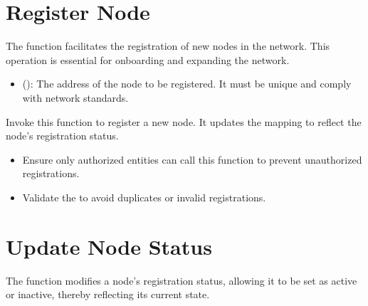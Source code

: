 \documentclass[letterpaper,10pt,english]{sphinxmanual}
\begin{document}
\sphinxAtStartPar
{}


\section{Register Node}
\label{\detokenize{docs_node_manager_contract:register-node}}
\sphinxAtStartPar
The  function facilitates the registration of new nodes in the network. This operation is essential for onboarding and expanding the network.

\sphinxAtStartPar
{}

\sphinxAtStartPar
{}
\begin{itemize}
\item {} 
\sphinxAtStartPar
{} ():
The address of the node to be registered. It must be unique and comply with network standards.

\end{itemize}

\sphinxAtStartPar
{}

\sphinxAtStartPar
Invoke this function to register a new node. It updates the  mapping to reflect the node’s registration status.

\sphinxAtStartPar
{}
\begin{itemize}
\item {} 
\sphinxAtStartPar
{} Ensure only authorized entities can call this function to prevent unauthorized registrations.

\item {} 
\sphinxAtStartPar
{} Validate the  to avoid duplicates or invalid registrations.

\end{itemize}


\section{Update Node Status}
\label{\detokenize{docs_node_manager_contract:update-node-status}}
\sphinxAtStartPar
The  function modifies a node’s registration status, allowing it to be set as active or inactive, thereby reflecting its current state.
\end{document}
